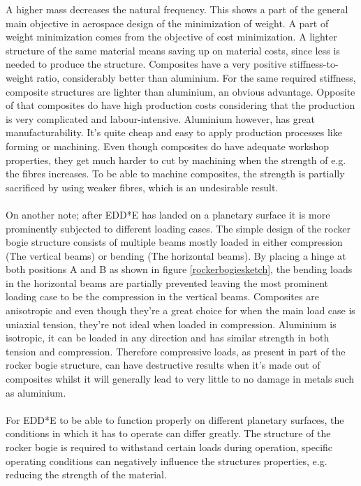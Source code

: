 A higher mass decreases the natural frequency. This shows a part of the general main objective in aerospace design of the minimization of weight. A part of weight minimization comes from the objective of cost minimization. A lighter structure of the same material means saving up on material costs, since less is needed to produce the structure. Composites have a very positive stiffness-to-weight ratio, considerably better than aluminium. For the same required stiffness, composite structures are lighter than aluminium, an obvious advantage. Opposite of that composites do have high production costs considering that the production is very complicated and labour-intensive. Aluminium however, has great manufacturability. It’s quite cheap and easy to apply production processes like forming or machining. Even though composites do have adequate workshop properties, they get much harder to cut by machining when the strength of e.g. the fibres increases. To be able to machine composites, the strength is partially sacrificed by using weaker fibres, which is an undesirable result.
\\
\\
On another note; after EDD*E has landed on a planetary surface it is more prominently subjected to different loading cases. The simple design of the rocker bogie structure consists of multiple beams mostly loaded in either compression (The vertical beams) or bending (The horizontal beams). By placing a hinge at both positions A and B as shown in figure \ref{rockerbogiesketch}, the bending loads in the horizontal beams are partially prevented leaving the most prominent loading case to be the compression in the vertical beams. Composites are anisotropic and even though they’re a great choice for when the main load case is uniaxial tension, they’re not ideal when loaded in compression. Aluminium is isotropic, it can be loaded in any direction and has similar strength in both tension and compression. Therefore compressive loads, as present in part of the rocker bogie structure, can have destructive results when it’s made out of composites whilst it will generally lead to very little to no damage in metals such as aluminium.
\\
\\
For EDD*E to be able to function properly on different planetary surfaces, the conditions in which it has to operate can differ greatly. The structure of the rocker bogie is required to withstand certain loads during operation, specific operating conditions can negatively influence the structures properties, e.g. reducing the strength of the material. 
